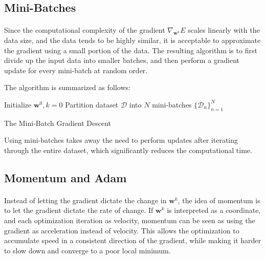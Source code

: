 \subsection{Mini-Batches} \label{subsc:mini_batches}

\paragraph{}
Since the computational complexity of the gradient 
$\nabla_{\mathbf{w}^k}E$ scales linearly with the data size,
and the data tends to be highly similar, 
it is acceptable to approximate the gradient using 
a small portion of the data.
The resulting algorithm is to first divide up 
the input data into smaller batches, 
and then perform a gradient update for every mini-batch 
at random order.

The algorithm is summarized as follows:

\begin{algorithm}[H]
 Initialize $\mathbf{w}^0, k=0$\;
 {Partition} dataset $\mathcal{D}$ into $N$
    mini-batches $\{\mathcal{D}_n\}_{n=1}^N$ \;
 \caption{The Mini-Batch Gradient Descent}
\end{algorithm}

Using mini-batches takes away the need to perform updates 
after iterating through the entire dataset, 
which significantly reduces the computational time.





\subsection{Momentum and Adam} \label{subsc:momemtum}

\paragraph{}
Instead of letting the gradient dictate the change in $\mathbf{w}^k$,
the idea of momentum is to let the gradient dictate the rate of change.
If $\mathbf{w}^k$ is interpreted as a coordinate,
and each optimization iteration as velocity,
momentum can be seen as using the gradient as acceleration
instead of velocity. 
This allows the optimization to accumulate speed in 
a consistent direction of the gradient, 
while making it harder to slow down and 
converge to a poor local minimum.

